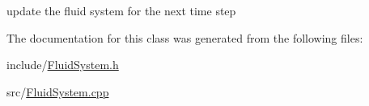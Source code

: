 update the fluid system for the next time step 

The documentation for this class was generated from the following files:\begin{DoxyCompactItemize}
\item 
include/\hyperlink{FluidSystem_8h}{FluidSystem.h}\item 
src/\hyperlink{FluidSystem_8cpp}{FluidSystem.cpp}\end{DoxyCompactItemize}

